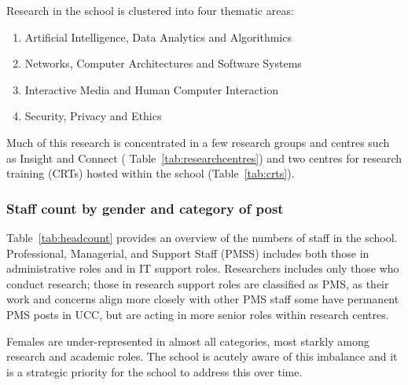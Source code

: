 


Research in the school is clustered into four thematic areas:
\begin{enumerate}[noitemsep]
    \item Artificial Intelligence, Data Analytics and Algorithmics
    \item Networks, Computer Architectures and Software Systems 
    \item Interactive Media and Human Computer Interaction
    \item Security, Privacy and Ethics
\end{enumerate}


Much of this research is concentrated in a few 
research groups and centres such as Insight and Connect 
( Table~\ref{tab:researchcentres}) and two centres for research 
training (CRTs) hosted within the school 
(Table~\ref{tab:crts}). 






\newpage 
\subsubsection{Staff count by gender and category of post}

Table~\ref{tab:headcount} provides an overview of the numbers of staff 
in the school. Professional, Managerial, and Support Staff (PMSS) 
includes both those in administrative roles and in IT support roles.
Researchers includes only those who conduct research; those in
research support roles are classified as PMS, as their work and
concerns align more  closely with other PMS staff some
have permanent PMS posts in UCC, but are acting in more senior 
roles within research centres.

%

% 

%
Females are under-represented in almost all categories, most 
starkly among research and  academic roles. The school is acutely 
aware of this imbalance  and it is a strategic priority for the 
school to address this over time.


